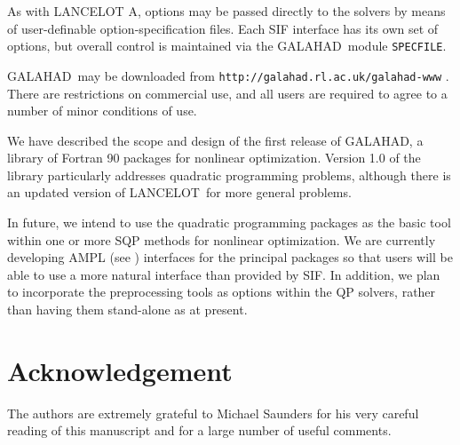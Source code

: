 \documentclass[twoside]{article}
\newcommand{\gal}{{\sf GALAHAD}}
\newcommand{\lan}{{\sf LANCELOT}}
\newcommand{\lana}{{\sf LANCELOT A}}
\begin{document}
As with \lana, options may be passed directly to the solvers by means of
user-definable option-specification files. Each SIF interface
has its own set of options, but overall control is maintained via
the \gal\ module {\tt SPECFILE}.

{}

\gal\ may be downloaded from
{\tt http://galahad.rl.ac.uk/galahad-www} .
There are restrictions on commercial use, and all users are required to
agree to a number of minor conditions of use.


We have described the scope and design of the first release of \gal,
a library of Fortran 90 packages for nonlinear optimization.
Version 1.0 of the library particularly addresses quadratic programming
problems, although there is an updated version of \lan\ for more general
problems.

In future, we intend to use the quadratic programming packages as the
basic tool within one or more SQP methods for nonlinear optimization.
We are currently developing AMPL (see ) interfaces
for the principal packages so that users will be able to use a more
natural interface than provided by SIF. In addition, we plan to incorporate
the preprocessing tools as options within the QP solvers, rather than having
them stand-alone as at present.

\section*{Acknowledgement}

The authors are extremely grateful to Michael Saunders for his very
careful reading of this manuscript and for a large number of useful comments.

\end{document}

